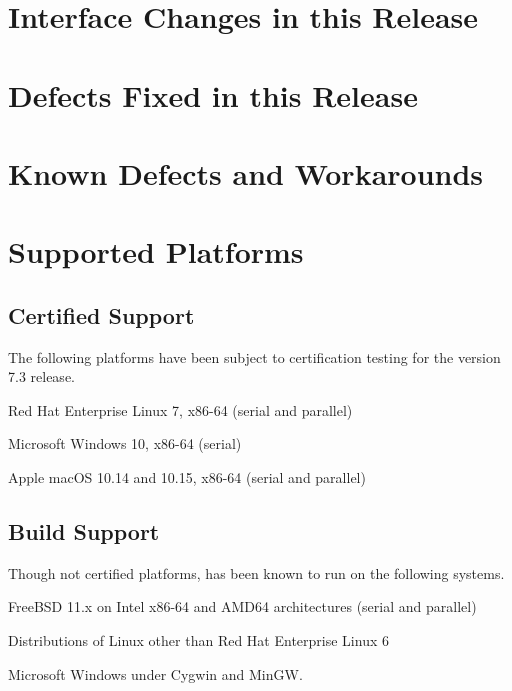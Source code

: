 \documentclass[letterpaper]{scrartcl}
\begin{document}
\newpage
\section{Interface Changes in this Release}


\newpage
\section{Defects Fixed in this Release}


\newpage
\section{Known Defects and Workarounds}


\newpage
\section{Supported Platforms}
\subsection*{Certified Support}
The following platforms have been subject to certification testing for the
\Xyce{} version 7.3 release.
\begin{XyceItemize}
  \item Red Hat Enterprise Linux 7, x86-64 (serial and parallel)
  \item Microsoft Windows 10, x86-64 (serial)
  \item Apple macOS 10.14 and 10.15, x86-64 (serial and parallel)
\end{XyceItemize}


\subsection*{Build Support}
Though not certified platforms, \Xyce{} has been known to run on the following
systems.
\begin{XyceItemize}
  \item FreeBSD 11.x on Intel x86-64 and AMD64 architectures (serial
    and parallel)
  \item Distributions of Linux other than Red Hat Enterprise Linux 6
  \item Microsoft Windows under Cygwin and MinGW.
\end{XyceItemize}
\end{document}
